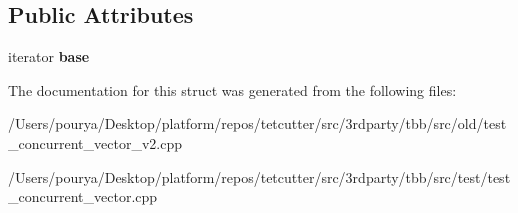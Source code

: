 \subsection*{Public Attributes}
\begin{DoxyCompactItemize}
\item 
\hypertarget{structCheckElement_a3f80f3263442ec230086dfea6c64cc41}{}iterator {\bfseries base}\label{structCheckElement_a3f80f3263442ec230086dfea6c64cc41}

\end{DoxyCompactItemize}


The documentation for this struct was generated from the following files\+:\begin{DoxyCompactItemize}
\item 
/\+Users/pourya/\+Desktop/platform/repos/tetcutter/src/3rdparty/tbb/src/old/test\+\_\+concurrent\+\_\+vector\+\_\+v2.\+cpp\item 
/\+Users/pourya/\+Desktop/platform/repos/tetcutter/src/3rdparty/tbb/src/test/test\+\_\+concurrent\+\_\+vector.\+cpp\end{DoxyCompactItemize}

